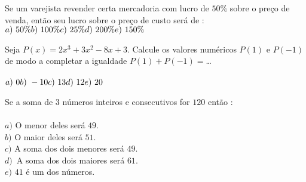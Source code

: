 \hline
\vfill

\begin{quest}
	Se um varejista revender certa mercadoria com lucro de $50\%$ sobre o pre\c{c}o de venda, ent\~ao seu lucro sobre o pre\c{c}o de custo ser\'a de : \\
	\(\displaystyle a)\ 50\% \hfill b)\ 100\% \hfill c)\ 25\% \hfill d)\ 200\% \hfill e)\ 150\% \)
\end{quest}

\hline
\vfill

\begin{quest}
	Seja $P(x) = 2x^3+3x^2-8x+3$. Calcule os valores num\'ericos $P(1)$ e $P(-1)$ de modo a completar a igualdade $P(1) + P(-1) =$\dots \\ \\
	\(\displaystyle a)\ 0 \hfill b)\ -10 \hfill c)\ 13 \hfill d)\ 12 \hfill e)\ 20 \)
\end{quest}

\hline
\vfill

\begin{quest}
	Se a soma de $3$ n\'umeros inteiros e consecutivos for $120$ ent\~ao :\\\\
	$a)$ O menor deles ser\'a $49$. \\ $b)$ O maior deles ser\'a $51$. \\ $c)$ A soma dos dois menores ser\'a $49$. \\ $d)$\ A soma dos dois maiores ser\'a $61$. \\ $e)$ $41$ \'e um dos n\'umeros.
\end{quest}

\hline
\vfill

\begin{quest}

\end{quest}

